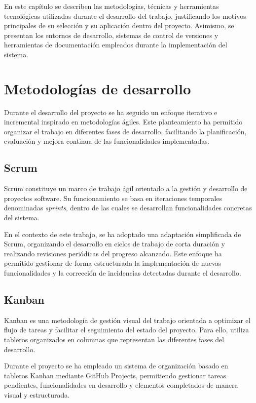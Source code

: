 
En este capítulo se describen las metodologías, técnicas y herramientas tecnológicas utilizadas durante el desarrollo del trabajo, justificando los motivos principales de su selección y su aplicación dentro del proyecto. Asimismo, se presentan los entornos de desarrollo, sistemas de control de versiones y herramientas de documentación empleados durante la implementación del sistema.

\section{Metodologías de desarrollo}

Durante el desarrollo del proyecto se ha seguido un enfoque iterativo e incremental inspirado en metodologías ágiles. Este planteamiento ha permitido organizar el trabajo en diferentes fases de desarrollo, facilitando la planificación, evaluación y mejora continua de las funcionalidades implementadas.

\subsection{Scrum}

Scrum constituye un marco de trabajo ágil orientado a la gestión y desarrollo de proyectos software. Su funcionamiento se basa en iteraciones temporales denominadas \textit{sprints}, dentro de las cuales se desarrollan funcionalidades concretas del sistema.

En el contexto de este trabajo, se ha adoptado una adaptación simplificada de Scrum, organizando el desarrollo en ciclos de trabajo de corta duración y realizando revisiones periódicas del progreso alcanzado. Este enfoque ha permitido gestionar de forma estructurada la implementación de nuevas funcionalidades y la corrección de incidencias detectadas durante el desarrollo.

\subsection{Kanban}

Kanban es una metodología de gestión visual del trabajo orientada a optimizar el flujo de tareas y facilitar el seguimiento del estado del proyecto. Para ello, utiliza tableros organizados en columnas que representan las diferentes fases del desarrollo.

Durante el proyecto se ha empleado un sistema de organización basado en tableros Kanban mediante GitHub Projects, permitiendo gestionar tareas pendientes, funcionalidades en desarrollo y elementos completados de manera visual y estructurada.

